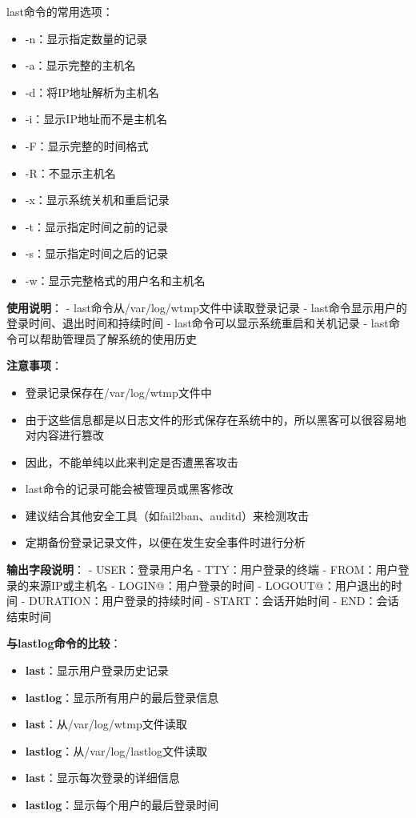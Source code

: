 \documentclass[12pt,UTF8]{ctexbook}
\begin{document}
last命令的常用选项：
\begin{itemize}
    \item -n：显示指定数量的记录
    \item -a：显示完整的主机名
    \item -d：将IP地址解析为主机名
    \item -i：显示IP地址而不是主机名
    \item -F：显示完整的时间格式
    \item -R：不显示主机名
    \item -x：显示系统关机和重启记录
    \item -t：显示指定时间之前的记录
    \item -s：显示指定时间之后的记录
    \item -w：显示完整格式的用户名和主机名
\end{itemize}

\textbf{使用说明}：
- last命令从/var/log/wtmp文件中读取登录记录
- last命令显示用户的登录时间、退出时间和持续时间
- last命令可以显示系统重启和关机记录
- last命令可以帮助管理员了解系统的使用历史

\textbf{注意事项}：
\begin{itemize}
    \item 登录记录保存在/var/log/wtmp文件中
    \item 由于这些信息都是以日志文件的形式保存在系统中的，所以黑客可以很容易地对内容进行篡改
    \item 因此，不能单纯以此来判定是否遭黑客攻击
    \item last命令的记录可能会被管理员或黑客修改
    \item 建议结合其他安全工具（如fail2ban、auditd）来检测攻击
    \item 定期备份登录记录文件，以便在发生安全事件时进行分析
\end{itemize}

\textbf{输出字段说明}：
- USER：登录用户名
- TTY：用户登录的终端
- FROM：用户登录的来源IP或主机名
- LOGIN@：用户登录的时间
- LOGOUT@：用户退出的时间
- DURATION：用户登录的持续时间
- START：会话开始时间
- END：会话结束时间

\textbf{与lastlog命令的比较}：
\begin{itemize}
    \item \textbf{last}：显示用户登录历史记录
    \item \textbf{lastlog}：显示所有用户的最后登录信息
    \item \textbf{last}：从/var/log/wtmp文件读取
    \item \textbf{lastlog}：从/var/log/lastlog文件读取
    \item \textbf{last}：显示每次登录的详细信息
    \item \textbf{lastlog}：显示每个用户的最后登录时间
\end{itemize}
\end{document}
